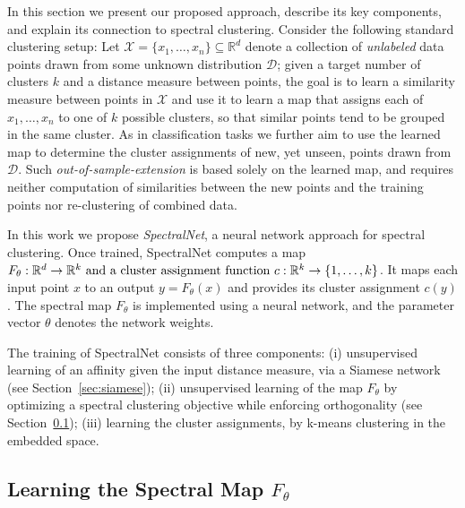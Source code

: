 \documentclass{article} %
\begin{document}
In this section we present our proposed approach, describe its key components, and explain its connection to spectral clustering.
Consider the following standard clustering setup: Let $\mathcal{X}=\{x_1,\ldots,x_n\} \subseteq \mathbb{R}^d$ denote a collection of \textit{unlabeled} data points drawn from some unknown distribution $\mathcal{D}$; given a target number of clusters \(k\) and a distance measure between points, the goal is to learn a similarity measure between points in $\mathcal{X}$ and use it to learn a map that assigns each of  $x_1,\ldots,x_n$ to one of $k$ possible clusters, so that similar points tend to be grouped in the same cluster.
As in classification tasks we further aim to use the learned map to determine the cluster assignments of new, yet unseen, points drawn from $\mathcal{D}$. Such \textit{out-of-sample-extension} is based solely on the learned map, and requires neither computation of similarities between the new points and the training points nor re-clustering of combined data.

In this work we propose \textit{SpectralNet}, a neural network approach for spectral clustering.
Once trained, SpectralNet computes a map
\(F_{\theta}:\mathbb{R}^d\to \mathbb{R}^k$
and a cluster assignment function $c:\mathbb{R}^k\to \{1,\ldots,k\}\). It maps each input point \(x\) to an output \(y=F_{\theta}(x)\) and provides its cluster assignment \(c(y)\). The spectral map $F_\theta$ is implemented using a neural network, and the parameter vector $\theta$ denotes the network weights.

The training of SpectralNet consists of three components: (i) unsupervised learning of an affinity given the input distance measure, via a Siamese network (see Section~\ref{sec:siamese}); (ii) unsupervised learning of the map \(F_{\theta}\) by optimizing a spectral clustering objective while enforcing orthogonality (see Section~\ref{sec:spectralMap}); (iii) learning the cluster assignments, by k-means clustering in the embedded space.


\subsection{Learning the Spectral Map \(F_\theta\)}
\label{sec:spectralMap}
\end{document}
